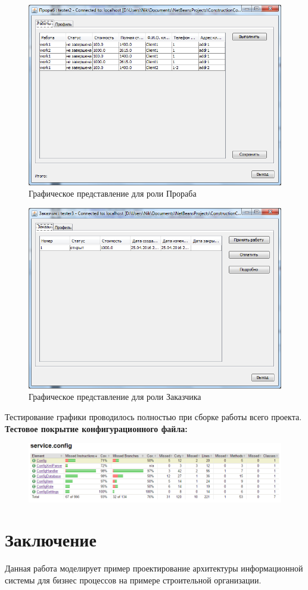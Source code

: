 \documentclass[12pt,a4paper,titlepage]{article}
\begin{document}
\begin{figure}[!ht]
\includegraphics[scale=0.6]{images/MasterView.png}\caption{Графическое представление для роли Прораба}
\end{figure}

\begin{figure}[!ht]
\includegraphics[scale=0.6]{images/ClientView.png}\caption{Графическое представление для роли Заказчика}
\end{figure}
\newpage
Тестирование графики проводилось полностью при сборке работы всего проекта.
\newpage
\textbf{Тестовое покрытие конфигурационного файла:}
\begin{figure}[!ht]
\includegraphics[scale=0.6]{images/configJUnitTest.png}\caption{}
\end{figure}
\newpage
\section{Заключение}
Данная работа моделирует пример проектирование архитектуры информационной системы для бизнес процессов на примере строительной организации.
\end{document}

